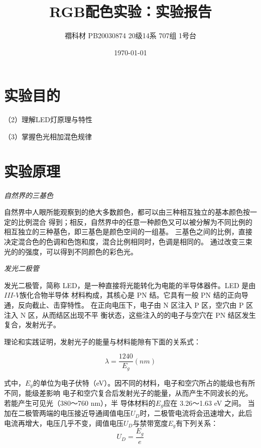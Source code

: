 \documentclass[UTF8]{ctexart}
\title{RGB配色实验：实验报告}
\author{禤科材 PB20030874 20级14系 707组 1号台}
\date{\today}
\begin{document}
    \maketitle

   \section{实验目的}
   \begin{center}

    （2）理解LED灯原理与特性

    （3）掌握色光相加混色规律
   \end{center}
   
    \section{实验原理}
    \begin{center}
        \emph{自然界的三基色}\\[0.4cm]
    \end{center}

    自然界中人眼所能观察到的绝大多数颜色，都可以由三种相互独立的基本颜色按一定的比例混合
得到；相反，自然界中的任意一种颜色又可以被分解为不同比例的相互独立的三种基色，即三基色是颜色空间的一组基。
三基色之间的比例，直接决定混合色的色调和色饱和度，混合比例相同时，色调是相同的。
通过改变三束光的的强度，可以得到不同颜色的彩色光。

\begin{center}
    \emph{发光二极管}\\[0.4cm]
\end{center}

发光二极管，简称 LED，是一种直接将光能转化为电能的半导体器件。LED 是由$III$-$V$族化合物半导体
材料构成，其核心是 PN 结。它具有一般 PN 结的正向导通，反向截止、击穿特性。
在正向电压下，电子由 N 区注入 P 区，空穴由 P 区注入 N 区，从而结区出现不平
衡状态，这些注入的的电子与空穴在 PN 结区发生复合，发射光子。

理论和实践证明，发射光子的能量与材料能隙有下面的关系式：

\begin{equation}
    \lambda =\frac{1240}{E_g}(nm)
\end{equation}

式中，$E_g$的单位为电子伏特（eV）。因不同的材料，电子和空穴所占的能级也有所不同，能级差影响
电子和空穴复合后发射光子的能量，从而产生不同波长的光。若能产生可见光（380～760 nm），半
导体材料的$E_g$应在 3.26～1.63 eV 之间。
当加在二极管两端的电压接近导通阈值电压$U_D$时，二极管电流将会迅速增大，此后电流再增大，电压几乎不变，阈值电压$U_D$与禁带宽度$E_g$有下列关系：
\begin{equation}
    U_D=\frac{E_g}{e}
\end{equation}
\end{document}
